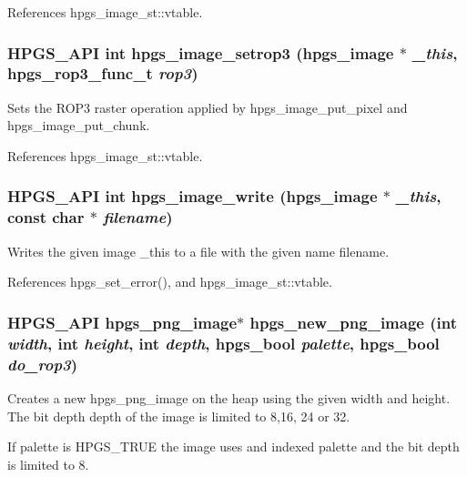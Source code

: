 References hpgs\_\-image\_\-st::vtable.

\subsubsection[{hpgs\_\-image\_\-setrop3}]{\setlength{\rightskip}{0pt plus 5cm}HPGS\_\-API int hpgs\_\-image\_\-setrop3 ({\bf hpgs\_\-image} $\ast$ {\em \_\-this}, \/  hpgs\_\-rop3\_\-func\_\-t {\em rop3})}\label{group__image_ga34ad39852d133cb855c6d315c2eb48eb}
Sets the ROP3 raster operation applied by {\ttfamily hpgs\_\-image\_\-put\_\-pixel} and {\ttfamily hpgs\_\-image\_\-put\_\-chunk}. 

References hpgs\_\-image\_\-st::vtable.

\subsubsection[{hpgs\_\-image\_\-write}]{\setlength{\rightskip}{0pt plus 5cm}HPGS\_\-API int hpgs\_\-image\_\-write ({\bf hpgs\_\-image} $\ast$ {\em \_\-this}, \/  const char $\ast$ {\em filename})}\label{group__image_ga3c87359a79f9da67a3a541cb4cb63c76}
Writes the given image {\ttfamily \_\-this} to a file with the given name {\ttfamily filename}. 

References hpgs\_\-set\_\-error(), and hpgs\_\-image\_\-st::vtable.

\subsubsection[{hpgs\_\-new\_\-png\_\-image}]{\setlength{\rightskip}{0pt plus 5cm}HPGS\_\-API {\bf hpgs\_\-png\_\-image}$\ast$ hpgs\_\-new\_\-png\_\-image (int {\em width}, \/  int {\em height}, \/  int {\em depth}, \/  hpgs\_\-bool {\em palette}, \/  hpgs\_\-bool {\em do\_\-rop3})}\label{group__image_ga1d4c0fff4731c1f76a4305fc4a6cea74}
Creates a new {\ttfamily hpgs\_\-png\_\-image} on the heap using the given {\ttfamily width} and {\ttfamily height}. The bit depth {\ttfamily depth} of the image is limited to 8,16, 24 or 32.

If {\ttfamily palette} is {\ttfamily HPGS\_\-TRUE} the image uses and indexed palette and the bit depth is limited to 8.

